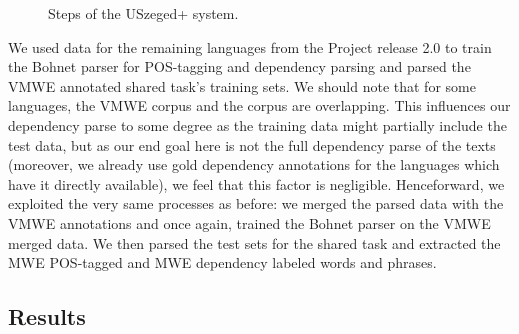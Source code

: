 \documentclass[output=paper,modfonts]{langscibook}
\begin{document}
\begin{figure}
\vspace{2em}
\caption{Steps of the USzeged+ system.}
\label{szeged+}
\end{figure}

We used data for the remaining languages from the  Project release 2.0 \citep{univdep} 
to train the Bohnet parser for POS-tagging and dependency parsing and parsed the VMWE annotated shared task's training sets.
We should note that for some languages, the VMWE corpus and the  corpus are overlapping. This influences our dependency parse to some degree as the training data might partially include the test data, but as our end goal here is not the full dependency parse of the texts (moreover, we already use gold dependency annotations for the languages which have it directly available), we feel that this factor is negligible. Henceforward, we exploited the very same processes as before: we merged the parsed data with the VMWE annotations and once again, trained the Bohnet parser on the VMWE merged data. We then parsed the test sets for the shared task and extracted the MWE POS-tagged and MWE dependency labeled words and phrases. 

\subsection{Results}
\end{document}
